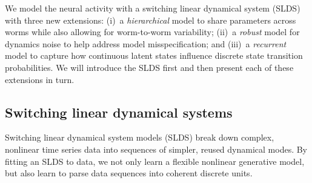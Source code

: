 \documentclass[11pt]{article}
\begin{document}
We model the neural activity with a switching linear
dynamical system (SLDS) with three new extensions: (i)~a \emph{hierarchical} model
to share parameters across worms while also allowing for worm-to-worm
variability; (ii)~a \emph{robust} model for dynamics noise to help address
model misspecification; and (iii)~a \emph{recurrent} model to capture
how continuous latent states influence discrete state transition probabilities.
We will introduce the SLDS first and then present each of these extensions
in turn.


\subsection{Switching linear dynamical systems}
\label{sec:slds}
Switching linear dynamical system models (SLDS) break down complex, nonlinear
time series data into sequences of simpler, reused dynamical modes.
By fitting an SLDS to data, we not only learn a flexible nonlinear generative
model, but also learn to parse data sequences into coherent discrete units.
\end{document}
